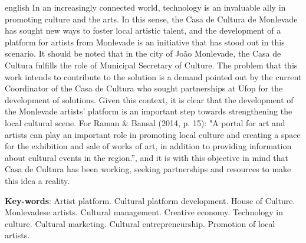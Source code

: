 \begin{resumo}[Abstract]
 \begin{otherlanguage*}{english}
   In an increasingly connected world, technology is an invaluable ally in promoting culture and the arts. In this sense, the Casa de Cultura de Monlevade has sought new ways to foster local artistic talent, and the development of a platform for artists from Monlevade is an initiative that has stood out in this scenario. It should be noted that in the city of João Monlevade, the Casa de Cultura fulfills the role of Municipal Secretary of Culture. The problem that this work intends to contribute to the solution is a demand pointed out by the current Coordinator of the Casa de Cultura who sought partnerships at Ufop for the development of solutions. Given this context, it is clear that the development of the Monlevade artists' platform is an important step towards strengthening the local cultural scene. For Raman & Bansal (2014, p. 15): "A portal for art and artists can play an important role in promoting local culture and creating a space for the exhibition and sale of works of art, in addition to providing information about cultural events in the region.”, and it is with this objective in mind that Casa de Cultura has been working, seeking partnerships and resources to make this idea a reality.

   \vspace{\onelineskip}

   \noindent
   \textbf{Key-words}: Artist platform.
     Cultural platform development.
     House of Culture.
     Monlevadese artists.
     Cultural management.
     Creative economy.
     Technology in culture.
     Cultural marketing.
     Cultural entrepreneurship.
     Promotion of local artists.
 \end{otherlanguage*}
\end{resumo}